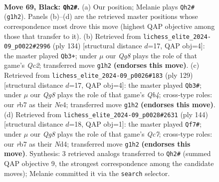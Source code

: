 \documentclass[11pt]{article}
\begin{document}
\clearpage

\begin{figure}[p]\centering
\begin{subfigure}{0.46\textwidth}\centering
\resizebox{\linewidth}{!}{%
\newchessgame
\chessboard[
  setfen={8/1R6/3p4/8/1N3k2/5n1K/8/6q1 b - - 1 69},
  showmover=false,
  pgfstyle=straightmove, color=movearrow, markmove={g1-h2}
]}
\caption{}
\end{subfigure}\hfill
\begin{subfigure}{0.46\textwidth}\centering
\resizebox{\linewidth}{!}{%
\newchessgame
\chessboard[
  setfen={8/8/8/4K3/1k1N4/8/2Q5/8 w - - 9 68},
  showmover=false,
  pgfstyle=straightmove, color=movearrow, markmove={c2-b3}
]}
\caption{}
\end{subfigure}
\\[4pt]
\begin{subfigure}{0.46\textwidth}\centering
\resizebox{\linewidth}{!}{%
\newchessgame
\chessboard[
  setfen={8/8/8/1q6/3nn3/K3k3/8/8 b - - 3 65},
  showmover=false,
  pgfstyle=straightmove, color=movearrow, markmove={b5-b3}
]}
\caption{}
\end{subfigure}\hfill
\begin{subfigure}{0.46\textwidth}\centering
\resizebox{\linewidth}{!}{%
\newchessgame
\chessboard[
  setfen={3N1k2/2Q5/8/5KP1/3N4/8/8/8 w - - 5 73},
  showmover=false,
  pgfstyle=straightmove, color=movearrow, markmove={c7-f7}
]}
\caption{}
\end{subfigure}
\caption{\textbf{Move 69, Black: \texttt{Qh2\#}.} (a) Our position; Melanie plays \texttt{Qh2\#} (\texttt{g1h2}). Panels (b)--(d) are the retrieved master positions whose correspondence most drove this move (highest QAP objective among those that transfer to it). (b) Retrieved from \texttt{lichess\_elite\_2024-09\_p0022\#2996} (ply 134) [structural distance $d$=17, QAP obj=4]: the master played \texttt{Qb3+}; under $\mu$ our \emph{Qg8} plays the role of that game's \emph{Qc2}; transferred move \texttt{g1h2} \textbf{(endorses this move)}. (c) Retrieved from \texttt{lichess\_elite\_2024-09\_p0026\#183} (ply 129) [structural distance $d$=17, QAP obj=4]: the master played \texttt{Qb3\#}; under $\mu$ our \emph{Qg8} plays the role of that game's \emph{Qb4}; cross-type roles: our \emph{r}b7 as their \emph{N}e4; transferred move \texttt{g1h2} \textbf{(endorses this move)}. (d) Retrieved from \texttt{lichess\_elite\_2024-09\_p0028\#2631} (ply 144) [structural distance $d$=18, QAP obj=1]: the master played \texttt{Qf7\#}; under $\mu$ our \emph{Qg8} plays the role of that game's \emph{Qc7}; cross-type roles: our \emph{r}b7 as their \emph{N}d4; transferred move \texttt{g1h2} \textbf{(endorses this move)}. Synthesis: 3 retrieved analogs transferred to \texttt{Qh2\#} (summed QAP objective 9, the strongest correspondence among the candidate moves); Melanie committed it via the \texttt{search} selector.}
\label{fig:thought-m137}
\end{figure}
\end{document}
